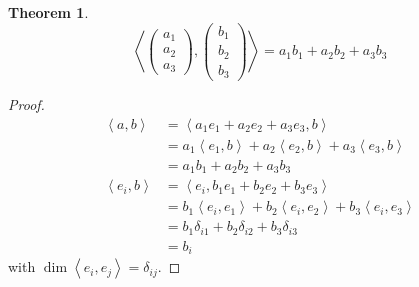\documentclass[a4paper,landscape,twocolumn]{article}
\newcommand\functional[1]{\left\langle{#1}\right\rangle}
\newtheorem{theorem}{Theorem}
\begin{document}
\begin{theorem}
  \label{satz-8.4}
  \[ \functional{\begin{pmatrix} a_1 \\ a_2 \\ a_3 \end{pmatrix}, \begin{pmatrix} b_1 \\ b_2 \\ b_3 \end{pmatrix}} = a_1 b_1 + a_2 b_2 + a_3 b_3 \]
\end{theorem}
\begin{proof}
  \begin{align*}
    \functional{a,b} &= \functional{a_1 e_1 + a_2 e_2 + a_3 e_3, b} \\
      &= a_1 \functional{e_1, b} + a_2 \functional{e_2, b} + a_3 \functional{e_3, b} \\
      &= a_1 b_1 + a_2 b_2 + a_3 b_3 \\
    \functional{e_i,b}
      &= \functional{e_i, b_1 e_1 + b_2 e_2 + b_3 e_3} \\
      &= b_1 \functional{e_i, e_1} + b_2 \functional{e_i, e_2} + b_3 \functional{e_i, e_3} \\
      &= b_1 \delta_{i1} + b_2 \delta_{i2} + b_3 \delta_{i3} \\
      &= b_i
  \end{align*}
  with $\dim\functional{e_i,e_j} = \delta_{ij}$.
\end{proof}
\end{document}
